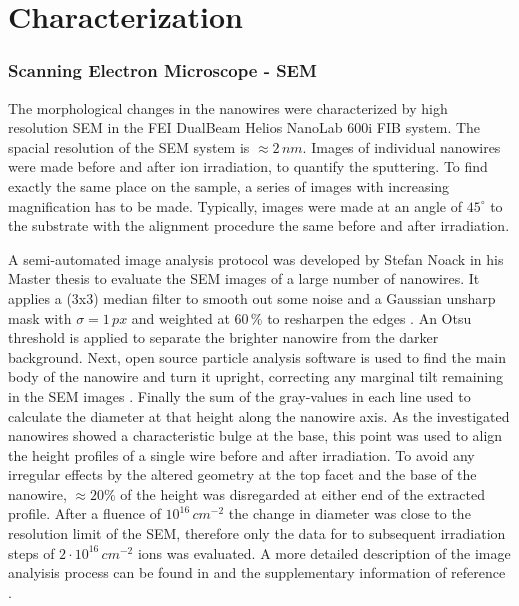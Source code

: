 \section{Characterization}

\subsubsection{Scanning Electron Microscope - SEM}

The morphological changes in the nanowires were characterized by high resolution SEM in the FEI DualBeam Helios NanoLab 600i FIB system. The spacial resolution of the SEM system is $\approx 2\,nm$. Images of individual nanowires were made before and after ion irradiation, to quantify the sputtering. To find exactly the same place on the sample, a series of images with increasing magnification has to be made. Typically, images were made at an angle of $45^\circ$ to the substrate with the alignment procedure the same before and after irradiation.

A semi-automated image analysis protocol was developed by Stefan Noack in his Master thesis \cite{noack_sputter_2014, johannes_anomalous_2015} to evaluate the SEM images of a large number of nanowires. It applies a (3x3) median filter to smooth out some noise and a Gaussian unsharp mask with $\sigma = 1\,px$ and weighted at $60\,\%$ to resharpen the edges \cite{sankur_survey_2004}. An Otsu threshold \cite{otsu_threshold_1979} is applied to separate the brighter nanowire from the darker background. Next, open source particle analysis software is used to find the main body of the nanowire and turn it upright, correcting any marginal tilt remaining in the SEM images \cite{schindelin_fiji:_2012,sage_imagej_2012}. Finally the sum of the gray-values in each line used to calculate the diameter at that height along the nanowire axis. As the investigated nanowires showed a characteristic bulge at the base, this point was used to align the height profiles of a single wire before and after irradiation. To avoid any irregular effects by the altered geometry at the top facet and the base of the nanowire, $\approx 20\%$ of the height was disregarded at either end of the extracted profile. After a fluence of $10^{16}\,cm^{-2}$ the change in diameter was close to the resolution limit of the SEM, therefore only the data for to subsequent irradiation steps of $2\cdot 10^{16}\,cm^{-2}$ ions was evaluated. A more detailed description of the image analyisis process can be found in \cite{noack_sputter_2014} and the supplementary information of reference \cite{johannes_anomalous_2015}.

